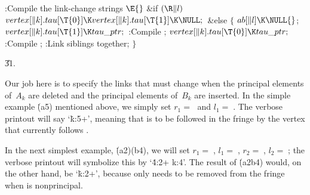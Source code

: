 \B{}:Compile the link-change strings %
\X${}\E{}$\6
\&{if} ${}(\R\|l){}$\1\5
${}\\{vertex}[\|k].\\{tau}[\T{0}]\K\\{vertex}[\|k].\\{tau}[\T{1}]\K\NULL;{}$\2\6
\&{else}\5
${}\{{}$\1\6
${}\\{ab}[\|l]\K\NULL{}$;\6
${}\\{vertex}[\|k].\\{tau}[\T{1}]\K\\{tau\_ptr};{}$\6
:Compile \X;\6
${}\\{vertex}[\|k].\\{tau}[\T{0}]\K\\{tau\_ptr};{}$\6
:Compile \X;\6
:Link siblings together\X;\6
\4${}\}{}$\2\par
\U31.\fi

Our job here is to specify the links that must change when the
principal elements of~$A_k$ are deleted and the principal elements of~$B_k$
are inserted. In the simple example \.{(a5)} mentioned above,
we simply set $r_1=\;$ and $l_1=\;$. The
verbose printout will say `\.{k:5+}', meaning that  is to
be followed in the fringe by the vertex that currently follows .

In the next simplest example, \.{(a2)(b4)}, we will set
$r_1=\;$,
$l_1=\;$,
$r_2=\;$,
$l_2=\;$;
the verbose printout will symbolize this by `\.{4:2+ k:4}'.
The result of \.{(a2b4)} would, on the other hand, be `\.{k:2+}',
because only  needs to be removed from the fringe when
 is nonprincipal.

